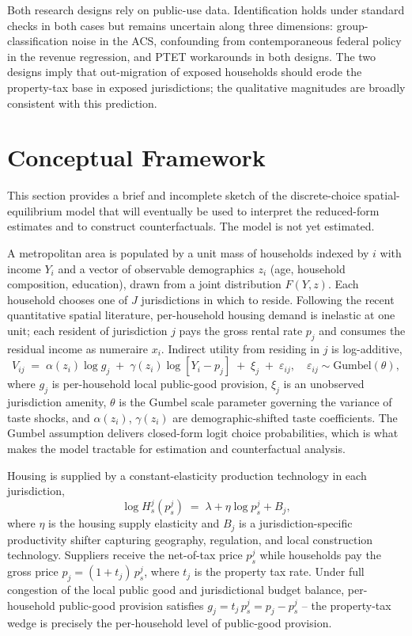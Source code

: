 \documentclass[12pt]{article}
\begin{document}
Both research designs rely on public-use data. Identification holds under standard checks in both cases but remains uncertain along three dimensions: group-classification noise in the ACS, confounding from contemporaneous federal policy in the revenue regression, and PTET workarounds in both designs. The two designs imply that out-migration of exposed households should erode the property-tax base in exposed jurisdictions; the qualitative magnitudes are broadly consistent with this prediction.


\section{Conceptual Framework}

This section provides a brief and incomplete sketch of the discrete-choice spatial-equilibrium model that will eventually be used to interpret the reduced-form estimates and to construct counterfactuals. The model is not yet estimated.

A metropolitan area is populated by a unit mass of households indexed by $i$ with income $Y_i$ and a vector of observable demographics $z_i$ (age, household composition, education), drawn from a joint distribution $F(Y, z)$. Each household chooses one of $J$ jurisdictions in which to reside. Following the recent quantitative spatial literature, per-household housing demand is inelastic at one unit; each resident of jurisdiction $j$ pays the gross rental rate $p_j$ and consumes the residual income as numeraire $x_i$. Indirect utility from residing in $j$ is log-additive,
\[
V_{ij} \;=\; \alpha(z_i) \log g_j \;+\; \gamma(z_i) \log \!\left[Y_i - p_j\right] \;+\; \xi_j \;+\; \varepsilon_{ij}, \quad \varepsilon_{ij} \sim \text{Gumbel}(\theta),
\]
where $g_j$ is per-household local public-good provision, $\xi_j$ is an unobserved jurisdiction amenity, $\theta$ is the Gumbel scale parameter governing the variance of taste shocks, and $\alpha(z_i)$, $\gamma(z_i)$ are demographic-shifted taste coefficients. The Gumbel assumption delivers closed-form logit choice probabilities, which is what makes the model tractable for estimation and counterfactual analysis.

Housing is supplied by a constant-elasticity production technology in each jurisdiction,
\[
\log H_s^j(p_s^j) \;=\; \lambda + \eta \log p_s^j + B_j,
\]
where $\eta$ is the housing supply elasticity and $B_j$ is a jurisdiction-specific productivity shifter capturing geography, regulation, and local construction technology. Suppliers receive the net-of-tax price $p_s^j$ while households pay the gross price $p_j = (1 + t_j)\, p_s^j$, where $t_j$ is the property tax rate. Under full congestion of the local public good and jurisdictional budget balance, per-household public-good provision satisfies $g_j = t_j\, p_s^j = p_j - p_s^j$ -- the property-tax wedge is precisely the per-household level of public-good provision.
\end{document}
